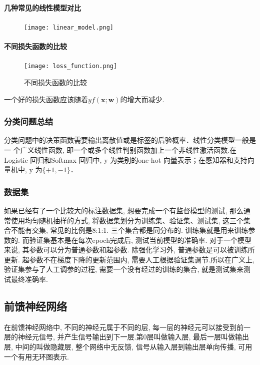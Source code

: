 \paragraph{几种常见的线性模型对比} 
\begin{figure}
    \centering
    \texttt{[image: linear\_model.png]}
    
\end{figure}
\newpage
\paragraph{不同损失函数的比较}
\begin{figure}
    \centering
    \texttt{[image: loss\_function.png]}
    \caption{不同损失函数的比较}
\end{figure} 
一个好的损失函数应该随着$yf(\mathbf{x;w})$的增大而减少.

\subsubsection{分类问题总结}
分类问题中的决策函数需要输出离散值或是标签的后验概率．线性分类模型一般是一
个广义线性函数, 即一个或多个线性判别函数加上一个非线性激活函数.在Logistic 回归和Softmax 回归中, y 为类别的one-hot 向量表示；在感知器和支持向量机中, y 为$\{+1, -1\}$．



\subsubsection{数据集}
如果已经有了一个比较大的标注数据集, 想要完成一个有监督模型的测试, 那么通常使用均匀随机抽样的方式, 将数据集划分为训练集、验证集、测试集, 这三个集合不能有交集, 常见的比例是8:1:1. 三个集合都是同分布的. 
训练集就是用来训练参数的. 而验证集基本是在每次epoch完成后, 测试当前模型的准确率. 
对于一个模型来说, 其参数可以分为普通参数和超参数. 除强化学习外, 普通参数是可以被训练所更新. 超参数不在梯度下降的更新范围内, 需要人工根据验证集调节.所以在广义上, 验证集参与了人工调参的过程, 需要一个没有经过的训练的集合, 就是测试集来测试最终准确率. \citep{training_validation_test_Su}


\subsection{前馈神经网络}
在前馈神经网络中, 不同的神经元属于不同的层, 每一层的神经元可以接受到前一层的神经元信号, 并产生信号输出到下一层.第0层叫做输入层, 最后一层叫做输出层, 中间的叫做隐藏层, 整个网络中无反馈, 信号从输入层到输出层单向传播, 可用一个有用无环图表示.

